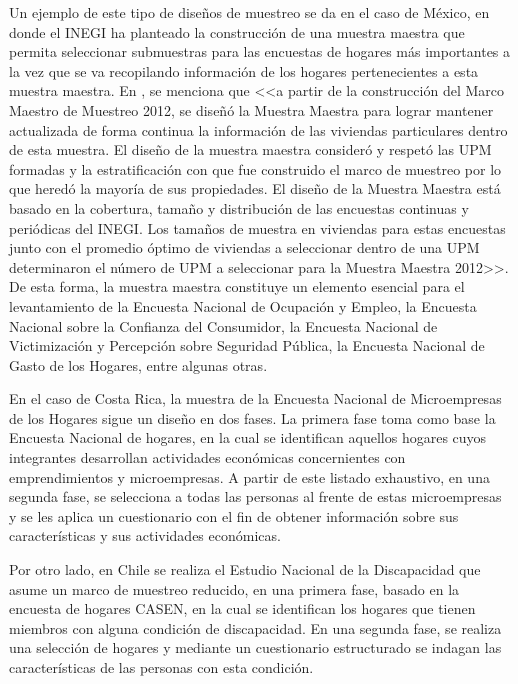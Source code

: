 \documentclass[
  12pt,
  spanish,
]{book}
\begin{document}
Un ejemplo de este tipo de diseños de muestreo se da en el caso de México, en donde el INEGI ha planteado la construcción de una muestra maestra que permita seleccionar submuestras para las encuestas de hogares más importantes a la vez que se va recopilando información de los hogares pertenecientes a esta muestra maestra. En \citet{INEGI_MX_2012}, se menciona que \textless\textless a partir de la construcción del Marco Maestro de Muestreo 2012, se diseñó la Muestra Maestra para lograr mantener actualizada de forma continua la información de las viviendas particulares dentro de esta muestra. El diseño de la muestra maestra consideró y respetó las UPM formadas y la estratificación con que fue construido el marco de muestreo por lo que heredó la mayoría de sus propiedades. El diseño de la Muestra Maestra está basado en la cobertura, tamaño y distribución de las encuestas continuas y periódicas del INEGI. Los tamaños de muestra en viviendas para estas encuestas junto con el promedio óptimo de viviendas a seleccionar dentro de una UPM determinaron el número de UPM a seleccionar para la Muestra Maestra 2012\textgreater\textgreater. De esta forma, la muestra maestra constituye un elemento esencial para el levantamiento de la Encuesta Nacional de Ocupación y Empleo, la Encuesta Nacional sobre la Confianza del Consumidor, la Encuesta Nacional de Victimización y Percepción sobre Seguridad Pública, la Encuesta Nacional de Gasto de los Hogares, entre algunas otras.

En el caso de Costa Rica, la muestra de la Encuesta Nacional de Microempresas de los Hogares sigue un diseño en dos fases. La primera fase toma como base la Encuesta Nacional de hogares, en la cual se identifican aquellos hogares cuyos integrantes desarrollan actividades económicas concernientes con emprendimientos y microempresas. A partir de este listado exhaustivo, en una segunda fase, se selecciona a todas las personas al frente de estas microempresas y se les aplica un cuestionario con el fin de obtener información sobre sus características y sus actividades económicas.

Por otro lado, en Chile se realiza el Estudio Nacional de la Discapacidad que asume un marco de muestreo reducido, en una primera fase, basado en la encuesta de hogares CASEN, en la cual se identifican los hogares que tienen miembros con alguna condición de discapacidad. En una segunda fase, se realiza una selección de hogares y mediante un cuestionario estructurado se indagan las características de las personas con esta condición.
\end{document}
